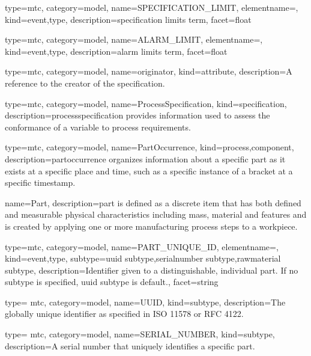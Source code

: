 {
  type=mtc,
  category=model,
  name={SPECIFICATION\_LIMIT},
  elementname=,
  kind={event,type},
  description={\glsdesc{specification limits term}},
  facet={\gls{float}}
}

{
  type=mtc,
  category=model,
  name={ALARM\_LIMIT},
  elementname=,
  kind={event,type},
  description={\glsdesc{alarm limits term}},
  facet={\gls{float}}
}

{
  type=mtc,
  category=model,
  name={originator},
  kind={attribute},
  description={A reference to the creator of the \gls{specification}.}
}

{
  type=mtc,
  category=model,
  name={ProcessSpecification},
  kind={specification},
  description={\gls{processspecification} provides information used to assess the conformance of a variable to process requirements.}
}

{
  type=mtc,
  category=model,
  name={PartOccurrence},
  kind={process,component},
  description={\gls{partoccurrence} \glspl{organize} information about a specific part as it exists at a specific place and time, such as a specific instance of a bracket at a specific timestamp.}
}

{
  name={Part},
  description={\gls{part} is defined as a discrete item that has both defined and measurable physical characteristics including mass, material and features and is created by applying one or more manufacturing process steps to a workpiece.}
}

{
  type=mtc,
  category=model,
  name={PART\_UNIQUE\_ID},
  elementname=,
  kind={event,type},
  subtype={\gls{uuid subtype},\gls{serialnumber subtype},\gls{rawmaterial subtype}},
  description={Identifier given to a distinguishable, individual part. If no \gls{subtype} is specified, \gls{uuid subtype} is default.},
  facet={\gls{string}}
}

{
  type= mtc,
  category=model,
  name={UUID},
  kind={subtype},
  description={The globally unique identifier as specified in ISO 11578 or RFC 4122.}
}

{
  type= mtc,
  category=model,
  name={SERIAL\_NUMBER},
  kind={subtype},
  description={A serial number that uniquely identifies a specific part.}
}


